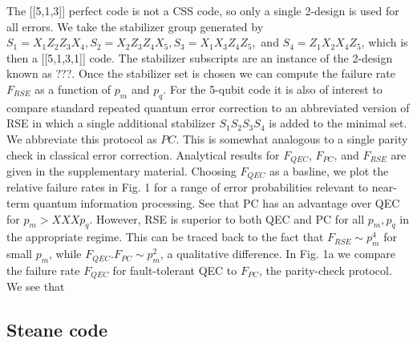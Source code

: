 \documentclass[reprint, superscriptaddress]{revtex4-1}
\numberwithin{equation}{section}
\numberwithin{figure}{section}
\numberwithin{table}{section}
\begin{document}
The [[5,1,3]] perfect code is not a CSS code, so only a single 2-design is used for all errors.  We take the stabilizer group generated by $S_1 = X_1 Z_2 Z_3 X_4, S_2 = X_2 Z_3 Z_4 X_5, S_3 = X_1 X_3 Z_4 Z_5,$ and $S_4 = Z_1 X_2 X_4 Z_5$, which is then a [[5,1,3,1]] code. The stabilizer subscripts are an instance of the 2-design known as  ???.  Once the stabilizer set is chosen we can compute the failure rate $F_{RSE}$ as a function of $p_m$ and $p_q$.  For the 5-qubit code it is also of interest to compare standard repeated quantum error correction to an abbreviated version of RSE in which a single additional stabilizer  
$ S_1 S_2 S_3 S_4$ is added to the minimal set.  We abbreviate this protocol as $PC$. This is somewhat analogous to a single parity check in classical error correction.  Analytical results for $F_{QEC}$, $F_{PC}$, and $F_{RSE}$ are given in the supplementary material.  Choosing $F_{QEC}$ as a basline, we plot the relative failure rates in Fig. 1 for a range of error probabilities relevant to near-term quantum information processing.  See that PC has an advantage over QEC for $p_m > XXX p_q$.  However, RSE is superior to both QEC and PC for all $p_m, p_q$ in the appropriate regime.  This can be traced back to the fact that $F_{RSE} \sim p_m^4$ for small $p_m$, while  $F_{QEC}. F_{PC} \sim p_m^2$, a qualitative difference.       
In Fig. 1a we compare the failure rate $F_{QEC}$ for fault-tolerant QEC to $F_{PC}$, the parity-check protocol.  We see that             

\subsection{Steane code}
\end{document}
